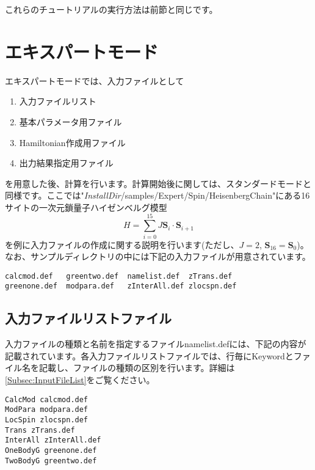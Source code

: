 これらのチュートリアルの実行方法は前節と同じです。

\newpage
\section{エキスパートモード}
エキスパートモードでは、入力ファイルとして
\begin{enumerate}
\item 入力ファイルリスト
\item 基本パラメータ用ファイル
\item Hamiltonian作成用ファイル
\item 出力結果指定用ファイル
\end{enumerate}
を用意した後、計算を行います。計算開始後に関しては、スタンダードモードと同様です。ここでは"{\it InstallDir}/samples/Expert/Spin/HeisenbergChain"にある16サイトの一次元鎖量子ハイゼンベルグ模型
\begin{equation}
H=\sum_{i=0}^{15} J {\bm S}_i\cdot {\bm S}_{i+1}
\end{equation}
を例に入力ファイルの作成に関する説明を行います(ただし、$J=2$, ${\bm S}_{16}={\bm S}_{0}$)。なお、サンプルディレクトリの中には下記の入力ファイルが用意されています。\\
\begin{minipage}{15cm}
\begin{screen}
\begin{verbatim}
calcmod.def   greentwo.def  namelist.def  zTrans.def
greenone.def  modpara.def   zInterAll.def zlocspn.def
\end{verbatim}
\end{screen}
\end{minipage}

\subsection{入力ファイルリストファイル}
入力ファイルの種類と名前を指定するファイルnamelist.defには、下記の内容が記載されています。各入力ファイルリストファイルでは、行毎にKeywordとファイル名を記載し、ファイルの種類の区別を行います。詳細は\ref{Subsec:InputFileList}をご覧ください。
\\
\begin{minipage}{15cm}
\begin{screen}
\begin{verbatim}
CalcMod calcmod.def
ModPara modpara.def
LocSpin zlocspn.def
Trans zTrans.def
InterAll zInterAll.def
OneBodyG greenone.def
TwoBodyG greentwo.def
\end{verbatim}
\end{screen}
\end{minipage}

